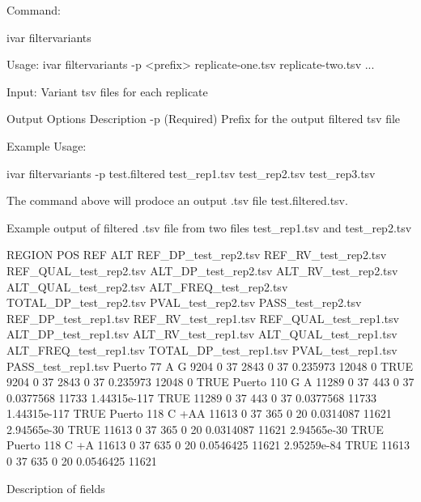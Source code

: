 Command\+: 
\begin{DoxyCode}
ivar filtervariants

Usage: ivar filtervariants -p <prefix> replicate-one.tsv replicate-two.tsv ...

Input: Variant tsv files for each replicate

Output Options   Description
           -p    (Required) Prefix for the output filtered tsv file
\end{DoxyCode}


Example Usage\+: 
\begin{DoxyCode}
ivar filtervariants -p test.filtered test\_rep1.tsv test\_rep2.tsv test\_rep3.tsv
\end{DoxyCode}


The command above will prodoce an output .tsv file test.\+filtered.\+tsv.

Example output of filtered .tsv file from two files test\+\_\+rep1.\+tsv and test\+\_\+rep2.\+tsv


\begin{DoxyCode}
REGION  POS REF ALT REF\_DP\_test\_rep2.tsv    REF\_RV\_test\_rep2.tsv    REF\_QUAL\_test\_rep2.tsv 
       ALT\_DP\_test\_rep2.tsv    ALT\_RV\_test\_rep2.tsv    ALT\_QUAL\_test\_rep2.tsv  ALT\_FREQ\_test\_rep2.tsv  TOTAL\_DP\_test\_rep2.tsv 
       PVAL\_test\_rep2.tsv  PASS\_test\_rep2.tsv  REF\_DP\_test\_rep1.tsv    REF\_RV\_test\_rep1.tsv    REF\_QUAL\_test\_rep1.tsv 
       ALT\_DP\_test\_rep1.tsv    ALT\_RV\_test\_rep1.tsv    ALT\_QUAL\_test\_rep1.tsv  ALT\_FREQ\_test\_rep1.tsv 
       TOTAL\_DP\_test\_rep1.tsv  PVAL\_test\_rep1.tsv  PASS\_test\_rep1.tsv  
Puerto  77  A   G   9204    0   37  2843    0   37  0.235973    12048   0   TRUE    9204    0   37  2843   
       0   37  0.235973    12048   0   TRUE    
Puerto  110 G   A   11289   0   37  443 0   37  0.0377568   11733   1.44315e-117    TRUE    11289   0   37 
       443 0   37  0.0377568   11733   1.44315e-117    TRUE    
Puerto  118 C   +AA 11613   0   37  365 0   20  0.0314087   11621   2.94565e-30 TRUE    11613   0   37  365
       0   20  0.0314087   11621   2.94565e-30 TRUE    
Puerto  118 C   +A  11613   0   37  635 0   20  0.0546425   11621   2.95259e-84 TRUE    11613   0   37  635
       0   20  0.0546425   11621   
\end{DoxyCode}


Description of fields

